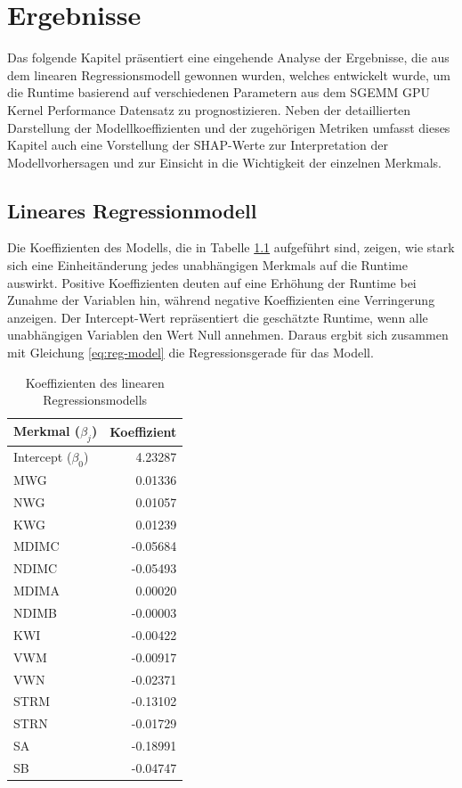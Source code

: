 \chapter{Ergebnisse}
\label{chapter:results}

Das folgende Kapitel präsentiert eine eingehende Analyse der Ergebnisse, 
die aus dem linearen Regressionsmodell gewonnen wurden, welches entwickelt wurde, 
um die Runtime basierend auf verschiedenen Parametern aus dem SGEMM GPU Kernel Performance 
Datensatz zu prognostizieren. Neben der detaillierten Darstellung der Modellkoeffizienten und 
der zugehörigen Metriken umfasst dieses Kapitel auch eine Vorstellung der SHAP-Werte 
zur Interpretation der Modellvorhersagen und zur Einsicht in die Wichtigkeit der einzelnen Merkmals.

\section{Lineares Regressionmodell}

Die Koeffizienten des Modells, die in 
Tabelle \ref{tab:model-coefficients} aufgeführt sind, zeigen, wie stark sich eine 
Einheitänderung jedes unabhängigen Merkmals auf die Runtime auswirkt. 
Positive Koeffizienten deuten auf eine Erhöhung der Runtime bei Zunahme der Variablen hin, 
während negative Koeffizienten eine Verringerung anzeigen. Der Intercept-Wert repräsentiert 
die geschätzte Runtime, wenn alle unabhängigen Variablen den Wert Null annehmen. Daraus ergbit sich
zusammen mit Gleichung \ref{eq:reg-model} die Regressionsgerade für das Modell.

\begin{table}[!h]
    \centering
    \caption{Koeffizienten des linearen Regressionsmodells}
    \begin{tabularx}{\textwidth}{Xr}
    \toprule
    Merkmal ($\beta_j$) & Koeffizient \\
    \midrule
    Intercept ($\beta_0$) & 4.23287 \\
    MWG & 0.01336 \\
    NWG & 0.01057 \\
    KWG & 0.01239 \\
    MDIMC & -0.05684 \\
    NDIMC & -0.05493 \\
    MDIMA & 0.00020 \\
    NDIMB & -0.00003 \\
    KWI & -0.00422 \\
    VWM & -0.00917 \\
    VWN & -0.02371 \\
    STRM & -0.13102 \\
    STRN & -0.01729 \\
    SA & -0.18991 \\
    SB & -0.04747 \\
    \bottomrule
    \end{tabularx}
    \label{tab:model-coefficients}
\end{table}

